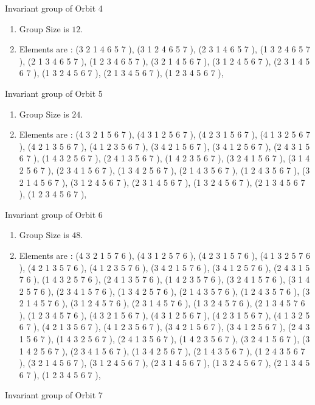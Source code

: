 \documentclass[12pt]{article}
\begin{document}
Invariant group of Orbit 4
\begin{enumerate}
\item Group Size is $12$.
\item Elements are : (3 2 1 4 6 5 7  ), (3 1 2 4 6 5 7  ), (2 3 1 4 6 5 7  ), (1 3 2 4 6 5 7  ), (2 1 3 4 6 5 7  ), (1 2 3 4 6 5 7  ), (3 2 1 4 5 6 7  ), (3 1 2 4 5 6 7  ), (2 3 1 4 5 6 7  ), (1 3 2 4 5 6 7  ), (2 1 3 4 5 6 7  ), (1 2 3 4 5 6 7  ), 
\end{enumerate}
Invariant group of Orbit 5
\begin{enumerate}
\item Group Size is $24$.
\item Elements are : (4 3 2 1 5 6 7  ), (4 3 1 2 5 6 7  ), (4 2 3 1 5 6 7  ), (4 1 3 2 5 6 7  ), (4 2 1 3 5 6 7  ), (4 1 2 3 5 6 7  ), (3 4 2 1 5 6 7  ), (3 4 1 2 5 6 7  ), (2 4 3 1 5 6 7  ), (1 4 3 2 5 6 7  ), (2 4 1 3 5 6 7  ), (1 4 2 3 5 6 7  ), (3 2 4 1 5 6 7  ), (3 1 4 2 5 6 7  ), (2 3 4 1 5 6 7  ), (1 3 4 2 5 6 7  ), (2 1 4 3 5 6 7  ), (1 2 4 3 5 6 7  ), (3 2 1 4 5 6 7  ), (3 1 2 4 5 6 7  ), (2 3 1 4 5 6 7  ), (1 3 2 4 5 6 7  ), (2 1 3 4 5 6 7  ), (1 2 3 4 5 6 7  ), 
\end{enumerate}
Invariant group of Orbit 6
\begin{enumerate}
\item Group Size is $48$.
\item Elements are : (4 3 2 1 5 7 6  ), (4 3 1 2 5 7 6  ), (4 2 3 1 5 7 6  ), (4 1 3 2 5 7 6  ), (4 2 1 3 5 7 6  ), (4 1 2 3 5 7 6  ), (3 4 2 1 5 7 6  ), (3 4 1 2 5 7 6  ), (2 4 3 1 5 7 6  ), (1 4 3 2 5 7 6  ), (2 4 1 3 5 7 6  ), (1 4 2 3 5 7 6  ), (3 2 4 1 5 7 6  ), (3 1 4 2 5 7 6  ), (2 3 4 1 5 7 6  ), (1 3 4 2 5 7 6  ), (2 1 4 3 5 7 6  ), (1 2 4 3 5 7 6  ), (3 2 1 4 5 7 6  ), (3 1 2 4 5 7 6  ), (2 3 1 4 5 7 6  ), (1 3 2 4 5 7 6  ), (2 1 3 4 5 7 6  ), (1 2 3 4 5 7 6  ), (4 3 2 1 5 6 7  ), (4 3 1 2 5 6 7  ), (4 2 3 1 5 6 7  ), (4 1 3 2 5 6 7  ), (4 2 1 3 5 6 7  ), (4 1 2 3 5 6 7  ), (3 4 2 1 5 6 7  ), (3 4 1 2 5 6 7  ), (2 4 3 1 5 6 7  ), (1 4 3 2 5 6 7  ), (2 4 1 3 5 6 7  ), (1 4 2 3 5 6 7  ), (3 2 4 1 5 6 7  ), (3 1 4 2 5 6 7  ), (2 3 4 1 5 6 7  ), (1 3 4 2 5 6 7  ), (2 1 4 3 5 6 7  ), (1 2 4 3 5 6 7  ), (3 2 1 4 5 6 7  ), (3 1 2 4 5 6 7  ), (2 3 1 4 5 6 7  ), (1 3 2 4 5 6 7  ), (2 1 3 4 5 6 7  ), (1 2 3 4 5 6 7  ), 
\end{enumerate}
Invariant group of Orbit 7
\end{document}
